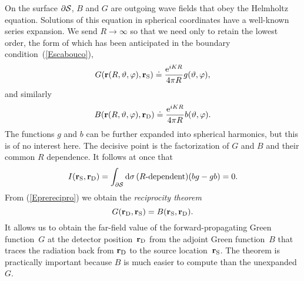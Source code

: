 On the surface $\partial\mathcal{S}$,
$B$ and $G$ are outgoing wave fields that obey the Helmholtz equation.
Solutions of this equation in spherical coordinates
have a well-known series expansion.
We send $R\to\infty$ so that we need only to retain the lowest order,
the form of which has been anticipated
in the boundary condition~(\ref{Escabouco}),
\begin{equation}
   G(\mathbf{r}(R,\vartheta,\varphi),\mathbf{r}_\text{S})
   \doteq \frac{\text{e}^{iKR}}{4\pi R} g(\vartheta,\varphi),
\end{equation}
and similarly 
\begin{equation}
   B(\mathbf{r}(R,\vartheta,\varphi),\mathbf{r}_\text{D})
   \doteq \frac{\text{e}^{iKR}}{4\pi R} b(\vartheta,\varphi).
\end{equation}
The functions $g$ and $b$ can be further expanded into spherical harmonics,
but this is of no interest here.
The decisive point is the factorization of $G$ and $B$
and their common $R$ dependence.
It follows at once that
\begin{equation}
  I(\mathbf{r}_\text{S},\mathbf{r}_\text{D})
  =\displaystyle\int_{\partial\mathcal{S}}\text{d}\sigma\,
       (\text{$R$-dependent})(bg-gb)
  = 0.
\end{equation}
From (\ref{Eprerecipro}) we obtain the \textit{reciprocity theorem}
\begin{equation}\label{Ereci}
  G(\mathbf{r}_\text{D},\mathbf{r}_\text{S}) = B(\mathbf{r}_\text{S},\mathbf{r}_\text{D}).
\end{equation}
It allows us to obtain the far-field value of the
forward-propagating Green function~$G$
at the detector position~$\mathbf{r}_\text{D}$
from the adjoint Green function~$B$
that traces the radiation back from $\mathbf{r}_\text{D}$
to the source location~$\mathbf{r}_\text{S}$.
The theorem is practically important because
$B$ is much easier to compute than the unexpanded~$G$.

%

